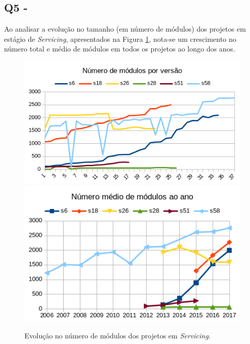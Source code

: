 \subsection{Q5 - \QuestaoCinco} %


Ao analisar a evolução no tamanho (em número de módulos) 
dos projetos em estágio de {\it Servicing}, apresentados na Figura \ref{modules-evolution-servicing},
nota-se um crescimento no número total e médio de módulos
em todos os projetos ao longo dos anos.


\begin{figure}[h]
  \center
  \includegraphics[scale=0.6]{imagens/modules-evolution-servicing.png}
  \includegraphics[scale=0.6]{imagens/modules-evolution-average.png}
  \caption{Evolução no número de módulos dos projetos em \textit{Servicing}.}
  \label{modules-evolution-servicing}
\end{figure}

